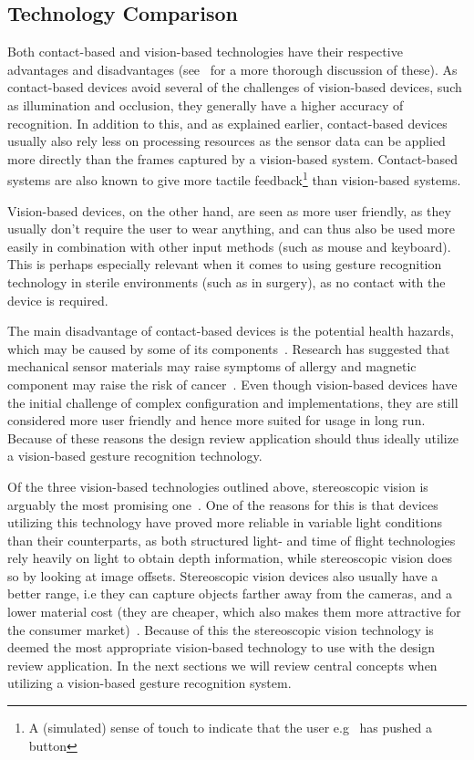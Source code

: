 \subsection{Technology Comparison}
\label{sec:vision_based_comparison}
Both contact-based and vision-based technologies have their respective advantages and disadvantages (see~\citet{Rautaray2015} for a more thorough discussion of these). 
As contact-based devices avoid several of the challenges of vision-based devices, such as illumination and occlusion, they generally have a higher accuracy of recognition.
In addition to this, and as explained earlier, contact-based devices usually also rely less on processing resources as the sensor data can be applied more directly than the
frames captured by a vision-based system. Contact-based systems are also known to give more tactile feedback\footnote{A (simulated) sense of touch to indicate that the user e.g~
has pushed a button} than vision-based systems.

Vision-based devices, on the other hand, are seen as more user friendly, as they usually don't require the user to wear anything, and can thus also be used more easily
in combination with other input methods (such as mouse and keyboard). This is perhaps especially relevant when it comes to using gesture recognition technology in
sterile environments (such as in surgery), as no contact with the device is required. 

The main disadvantage of contact-based devices is the potential health hazards, which may be caused by some of its components~\citep{Schultz2003}. 
Research has suggested that mechanical sensor materials may raise symptoms of allergy and magnetic component may raise the risk of cancer~\citep{Nishikawa2003}. 
Even though vision-based devices have the initial challenge of complex configuration and implementations, 
they are still considered more user friendly and hence more suited for usage in long run. 
Because of these reasons the design review application should thus ideally utilize a vision-based gesture recognition technology. 

Of the three vision-based technologies outlined above, stereoscopic vision is arguably the most promising one~\citep{Ko2012}.
One of the reasons for this is that devices utilizing this technology have proved more reliable in variable light conditions than their counterparts, 
as both structured light- and time of flight technologies rely heavily on light to obtain depth information, while stereoscopic vision does so by looking at image offsets.
Stereoscopic vision devices also usually have a better range, i.e they can capture objects farther away from the cameras, and 
a lower material cost (they are cheaper, which also makes them more attractive for the consumer market)~\citep{Ko2012}.
Because of this the stereoscopic vision technology is deemed the most appropriate vision-based technology to use with the design review application.
In the next sections we will review central concepts when utilizing a vision-based gesture recognition system.

